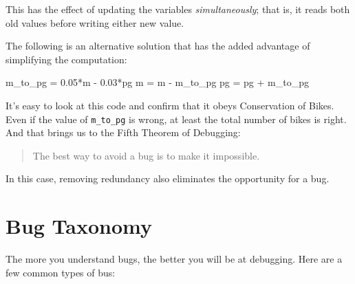 This has the effect of updating the variables \emph{simultaneously}; that
is, it reads both old values before writing either new value.


The following is an alternative solution that
has the added advantage of simplifying the computation:

\begin{code}
m_to_pg = 0.05*m - 0.03*pg
m = m - m_to_pg
pg = pg + m_to_pg
\end{code}

It's easy to look at this code and confirm that it obeys Conservation
of Bikes.  Even if the value of \lstinline{m_to_pg} is wrong, at least the total
number of bikes is right.  And that brings us to the Fifth Theorem of
Debugging:

\begin{quote}
The best way to avoid a bug is to make it impossible.
\end{quote}

In this case, removing redundancy also eliminates the opportunity for  a bug.

\section{Bug Taxonomy}

The more you understand bugs, the better you will be at debugging. Here are a few common types of bus:


